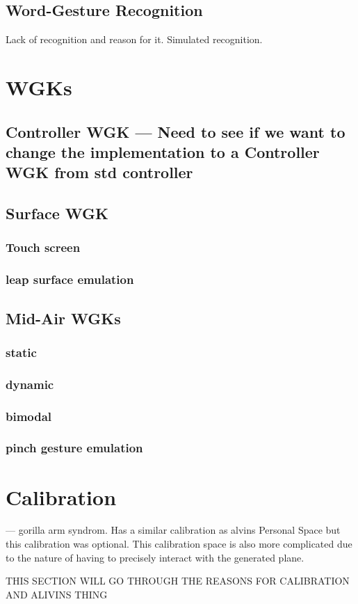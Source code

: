 \subsection{Word-Gesture Recognition}

Lack of recognition and reason for it. Simulated recognition.

\section{WGKs}

\subsection{Controller WGK --- Need to see if we want to change the implementation to a Controller WGK from std controller}

\subsection{Surface WGK}

\subsubsection{Touch screen}

\subsubsection{leap surface emulation}

\subsection{Mid-Air WGKs}

\subsubsection{static}

\subsubsection{dynamic}

\subsubsection{bimodal}

\subsubsection{pinch gesture emulation}

\section{Calibration}
--- gorilla arm syndrom. Has a similar calibration as alvins Personal Space but this calibration was optional. This calibration space is also more complicated due to the nature of having to precisely interact with the generated plane.

THIS SECTION WILL GO THROUGH THE REASONS FOR CALIBRATION AND ALIVINS THING
